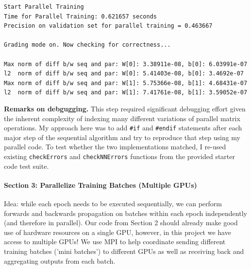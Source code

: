 \documentclass[12pt,letterpaper,twoside]{article}
\begin{document}
\begin{verbatim}
Start Parallel Training
Time for Parallel Training: 0.621657 seconds
Precision on validation set for parallel training = 0.463667

Grading mode on. Now checking for correctness...

Max norm of diff b/w seq and par: W[0]: 3.38911e-08, b[0]: 6.03991e-07
l2  norm of diff b/w seq and par: W[0]: 5.41403e-08, b[0]: 3.4692e-07
Max norm of diff b/w seq and par: W[1]: 5.75366e-08, b[1]: 4.68431e-07
l2  norm of diff b/w seq and par: W[1]: 7.41761e-08, b[1]: 3.59052e-07     
\end{verbatim}

\textbf{Remarks on debgugging.} This step required significant debugging effort given 
the inherent complexity of indexing many different variations of parallel matrix 
operations. My approach here was to add \texttt{\#if} and \texttt{\#endif} statements 
after each major step of the sequential algorithm and try to reproduce that step using 
my parallel code. To test whether the two implementations matched, I re-used existing 
\texttt{checkErrors} and \texttt{checkNNErrors} functions from the provided starter 
code test suite.


\pagebreak
\paragraph{Section 3: Parallelize Training Batches (Multiple GPUs)} Idea: while each epoch 
needs to be executed sequentially, we can perform forwards and backwards propagation on 
batches within each epoch independently (and therefore in parallel). Our code from Section 
2 should already make good use of hardware resources on a single GPU, however, in this 
project we have access to multiple GPUs! We use MPI to help coordinate sending different
training batches ('mini batches') to different GPUs as well as receiving back and 
aggregating outputs from each batch.
\end{document}
